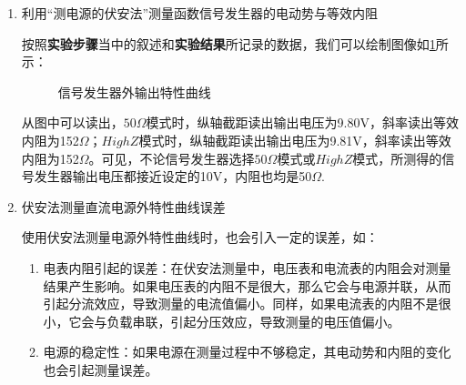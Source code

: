 \documentclass[dvipsnames, svgnames,a4paper,11pt]{article}
\begin{document}
\begin{enumerate}
\begin{enumerate}


			\item 利用“测电源的伏安法”测量函数信号发生器的电动势与等效内阻
			
			按照\textbf{实验步骤}当中的叙述和\textbf{实验结果}所记录的数据，我们可以绘制图像如\cref{fig:graph6}所示：
			
			\begin{figure}[htbp]
				\centering
				\quad
				\quad
				\caption{信号发生器外输出特性曲线}
				\label{fig:graph6}
			\end{figure}
			
			从图中可以读出，$50\Omega$模式时，纵轴截距读出输出电压为9.80V，斜率读出等效内阻为152$\Omega$；$HighZ$模式时，纵轴截距读出输出电压为9.81V，斜率读出等效内阻为152$\Omega$。可见，不论信号发生器选择$50\Omega$模式或$HighZ$模式，所测得的信号发生器输出电压都接近设定的10V，内阻也均是50$\Omega$.
			
			
			\item 伏安法测量直流电源外特性曲线误差
			
				使用伏安法测量电源外特性曲线时，也会引入一定的误差，如：
				\begin{enumerate}
					\item 电表内阻引起的误差：在伏安法测量中，电压表和电流表的内阻会对测量结果产生影响。如果电压表的内阻不是很大，那么它会与电源并联，从而引起分流效应，导致测量的电流值偏小。同样，如果电流表的内阻不是很小，它会与负载串联，引起分压效应，导致测量的电压值偏小。
					\item 电源的稳定性：如果电源在测量过程中不够稳定，其电动势和内阻的变化也会引起测量误差。
				\end{enumerate}
				

\end{enumerate}
\end{enumerate}
\end{document}
